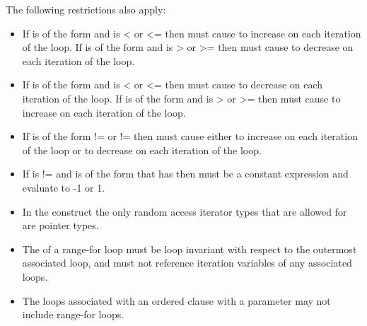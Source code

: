 \restrictions
The following restrictions also apply:

\begin{ccppspecific}
\begin{itemize}
    \item If  is of the form  
     and  is < or <= then  must cause  to increase on each
    iteration of the loop. If  is of
    the form    and 
    is > or >= then  must cause  to decrease on each iteration of the loop.

    \item If  is of the form  
     and  is < or <= then
     must cause  to decrease on each iteration of the loop. If  is of
    the form    and 
    is > or >= then  must cause  to increase on each iteration of the loop.

    \item If  is of the form  !=  or
     !=  then  must cause 
    either to increase on each iteration of the loop or to decrease on
    each iteration of the loop.

    \item If  is != and  is of the
    form that has  then  must be a constant expression and
    evaluate to -1 or 1.
\end{itemize}
\end{ccppspecific}

\begin{cppspecific}
  \begin{itemize}

    \item In the  construct the only random access iterator types that are
      allowed for  are pointer types.

    \item The  of a range-for loop must be loop invariant
      with respect to the outermost associated loop, and must not reference
      iteration variables of any associated loops.

    \item The loops associated with an ordered clause with a parameter may not
      include range-for loops.

  \end{itemize}
\end{cppspecific}

